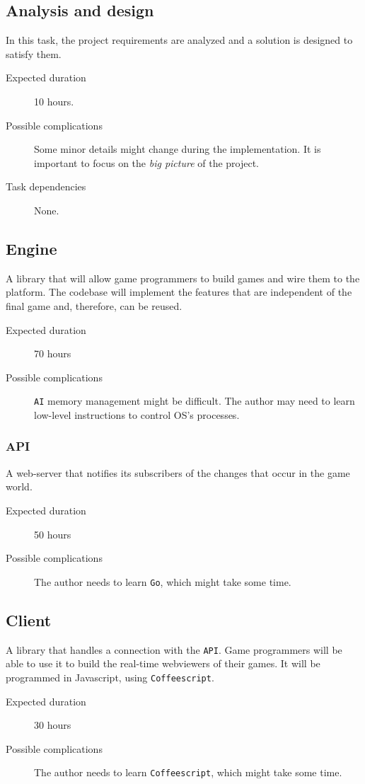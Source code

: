 \documentclass[a4paper,11pt,titlepage,abstract,numbers=noenddot,automark,mnsy,intlimits,rgb,dvipsnames]{report}
\begin{document}
\subsection{Analysis and design}
In this task, the project requirements are analyzed and a solution is designed to satisfy them.
\begin{description}
\item[Expected duration]
10 hours.
\item[Possible complications]
Some minor details might change during the implementation. It is
  important to focus on the \emph{big picture} of the project.
\item[Task dependencies]
None.
\end{description}
\subsection{Engine}
A library that will allow game programmers to build games and wire them to the platform. The codebase will implement the features that are independent of the final game and, therefore, can be reused.
\begin{description}
\item[Expected duration]
70 hours
\item[Possible complications]
\texttt{AI} memory management might be difficult.
  The author may need to learn low-level instructions to control OS's processes.
\end{description}
\subsubsection{API}
A web-server that notifies its subscribers of the changes that occur in the game world.
\begin{description}
\item[Expected duration]
50 hours
\item[Possible complications]
The author needs to learn \texttt{Go}, which might take some time.
\end{description}
\subsection{Client}
A library that handles a connection with the \texttt{API}. Game programmers will be able to use it to build
the real-time webviewers of their games. It will be programmed in \texttt{}Javascript\texttt{}, using \texttt{Coffeescript}.
\begin{description}
\item[Expected duration]
30 hours
\item[Possible complications]
The author needs to learn \texttt{Coffeescript}, which might take some time.
\end{description}
\end{document}
